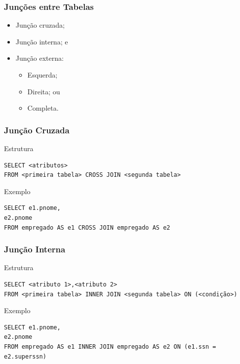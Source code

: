 \documentclass{beamer}
\begin{document}
\begin{frame}
\frametitle{Junções entre Tabelas}

\begin{itemize}
	\item Junção cruzada;
	\item Junção interna; e
	\item Junção externa:
	\begin{itemize}
		\item 	Esquerda;
		\item Direita; ou
		\item Completa.
	\end{itemize}
\end{itemize}
\end{frame}

\begin{frame}[fragile]
\frametitle{Junção Cruzada}

\begin{block}{Estrutura}
	\begin{lstlisting}
SELECT <atributos>
FROM <primeira tabela> CROSS JOIN <segunda tabela>
	\end{lstlisting}
\end{block}\vfill

\begin{exampleblock}{Exemplo}
	\begin{lstlisting}
SELECT e1.pnome,
e2.pnome
FROM empregado AS e1 CROSS JOIN empregado AS e2	
\end{lstlisting}
\end{exampleblock}
\end{frame}

\begin{frame}[fragile]
\frametitle{Junção Interna}

\begin{block}{Estrutura}
	\begin{lstlisting}
SELECT <atributo 1>,<atributo 2>
FROM <primeira tabela> INNER JOIN <segunda tabela> ON (<condição>)
	\end{lstlisting}
\end{block}\vfill

\begin{exampleblock}{Exemplo}
	\begin{lstlisting}
SELECT e1.pnome,
e2.pnome
FROM empregado AS e1 INNER JOIN empregado AS e2 ON (e1.ssn = e2.superssn)
	\end{lstlisting}
\end{exampleblock}
\end{frame}
\end{document}
